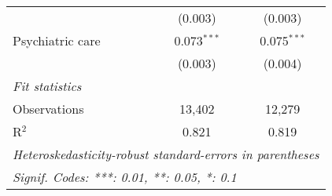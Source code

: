 \begin{tabular}{lcc}
                          & (0.003)                    & (0.003)                       \\
   Psychiatric care       & 0.073$^{***}$              & 0.075$^{***}$                 \\
                          & (0.003)                    & (0.004)                       \\
   \midrule
   \emph{Fit statistics}                                                               \\
   Observations           & 13,402                     & 12,279                        \\
   R$^2$                  & 0.821                      & 0.819                         \\
   \midrule \midrule
   \multicolumn{3}{l}{\emph{Heteroskedasticity-robust standard-errors in parentheses}} \\
   \multicolumn{3}{l}{\emph{Signif. Codes: ***: 0.01, **: 0.05, *: 0.1}}               \\
\end{tabular}
\par\endgroup

